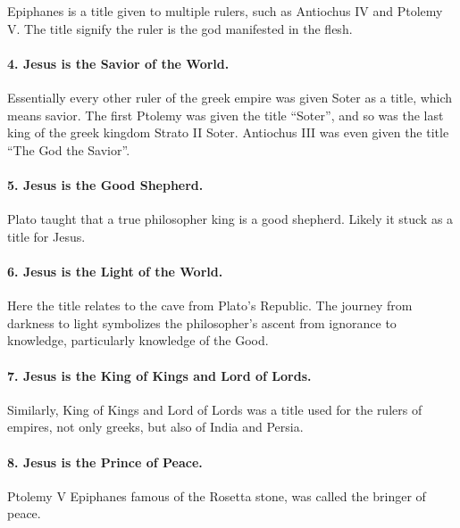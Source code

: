 Epiphanes is a title given to multiple rulers, such as Antiochus IV and Ptolemy V.
The title signify the ruler is the god manifested in the flesh.

\paragraph{4.
Jesus is the Savior of the World.}\label{par:jesus-is-the-savior-of-the-world.}

Essentially every other ruler of the greek empire was given Soter as a title, which means savior.
The first Ptolemy was given the title ``Soter'', and so was the last king of the greek kingdom Strato II Soter.
Antiochus III was even given the title ``The God the Savior''.

\paragraph{5.
Jesus is the Good Shepherd.}\label{par:jesus-is-the-good-shepherd.}

Plato taught that a true philosopher king is a good shepherd.
Likely it stuck as a title for Jesus.

\paragraph{6.
Jesus is the Light of the World.}\label{par:jesus-is-the-light-of-the-world.}

Here the title relates to the cave from Plato's Republic.
The journey from darkness to light symbolizes the philosopher's ascent from ignorance to knowledge, particularly knowledge of the Good.

\paragraph{7.
Jesus is the King of Kings and Lord of Lords.}\label{par:jesus-is-the-king-of-kings-and-lord-of-lords.}

Similarly, King of Kings and Lord of Lords was a title used for the rulers of empires, not only greeks, but also of India and Persia.

\paragraph{8.
Jesus is the Prince of Peace.}\label{par:jesus-is-the-prince-of-peace.}

Ptolemy V Epiphanes famous of the Rosetta stone, was called the bringer of peace.


